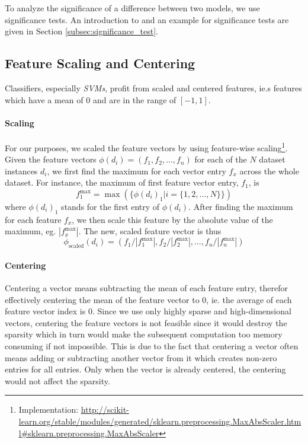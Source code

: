 To analyze the significance of a difference between two models, we use significance tests.
An introduction to and an example for significance tests are given in Section \ref{subsec:significance_test}.

\subsection{Feature Scaling and Centering}
Classifiers, especially \textit{SVMs}, profit from scaled and centered features, ie.s features which have a mean of 0 and are in the range of $[-1, 1]$.

\paragraph{Scaling}
For our purposes, we scaled the feature vectors by using feature-wise scaling\footnote{Implementation: \url{http://scikit-learn.org/stable/modules/generated/sklearn.preprocessing.MaxAbsScaler.html\#sklearn.preprocessing.MaxAbsScaler}}.
Given the feature vectors $\phi(d_i) = (f_1, f_2, \ldots, f_n)$ for each of the $N$ dataset instances $d_i$, we first find the maximum for each vector entry $f_x$ across the whole dataset. For instance, the maximum of first feature vector entry, $f_1$, is
\begin{equation*}
f_1^{\textrm{max}} = \max(\{\phi(d_i)_{1} | i = \{1, 2, \ldots, N\} \})
\end{equation*}
where $\phi(d_i)_{1}$ stands for the first entry of $\phi(d_i)$.
After finding the maximum for each feature $f_x$, we then scale this feature by the absolute value of the maximum, eg. $|f_x^{\textrm{max}}|$.
The new, scaled feature vector is thus
\begin{equation*}
\phi_{\textrm{scaled}}(d_i) = (f_1 / |f_1^{\textrm{max}}|, f_2 / |f_2^{\textrm{max}}|, \ldots, f_n / |f_n^{\textrm{max}}|)
\end{equation*}

\paragraph{Centering}
Centering a vector means subtracting the mean of each feature entry, therefor effectively centering the mean of the feature vector to 0, ie. the average of each feature vector index is 0.
Since we use only highly sparse and high-dimensional vectors, centering the feature vectors is not feasible since it would destroy the sparsity which in turn would make the subsequent computation too memory consuming if not impossible.
This is due to the fact that centering a vector often means adding or subtracting another vector from it which creates non-zero entries for all entries.
Only when the vector is already centered, the centering would not affect the sparsity.

